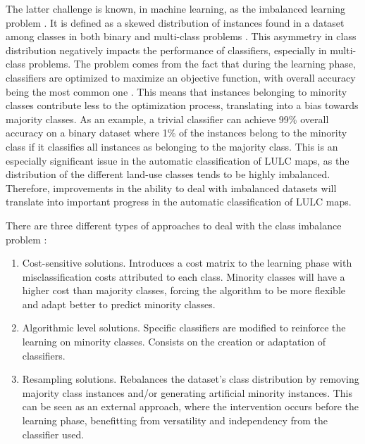 \documentclass[preprint,12pt]{elsarticle}
\begin{document}
The latter challenge is known, in machine learning, as the imbalanced learning
problem \cite{Chawla2004}. It is defined as a skewed distribution of instances
found in a dataset among classes in both binary and multi-class problems
\cite{Abdi2016}. This asymmetry in class distribution negatively impacts the
performance of classifiers, especially in multi-class problems.  The problem
comes from the fact that during the learning phase, classifiers are optimized
to maximize an objective function, with overall accuracy being the most common
one \cite{Maxwell2018}. This means that instances belonging to minority
classes contribute less to the optimization process, translating into a bias
towards majority classes. As an example, a trivial classifier can achieve 99\%
overall accuracy on a binary dataset where 1\% of the instances belong to the
minority class if it classifies all instances as belonging to the majority
class. This is an especially significant issue in the automatic classification
of LULC maps, as the distribution of the different land-use classes tends to
be highly imbalanced.  Therefore, improvements in the ability to deal with
imbalanced datasets will translate into important progress in the automatic
classification of LULC maps.

There are three different types of approaches to deal with the class imbalance
problem \cite{Fernandez2013,Kaur2019}:

\begin{enumerate}
    \item Cost-sensitive solutions. Introduces a cost matrix to the learning
        phase with misclassification costs attributed to each class. Minority
        classes will have a higher cost than majority classes, forcing the
        algorithm to be more flexible and adapt better to predict minority
        classes.
    \item Algorithmic level solutions. Specific classifiers are modified to
        reinforce the learning on minority classes. Consists on the creation or
        adaptation of classifiers.
    \item Resampling solutions. Rebalances the dataset's class distribution by
        removing majority class instances and/or generating artificial minority
        instances. This can be seen as an external approach, where the
        intervention occurs before the learning phase, benefitting from
        versatility and independency from the classifier used.
\end{enumerate}
\end{document}
